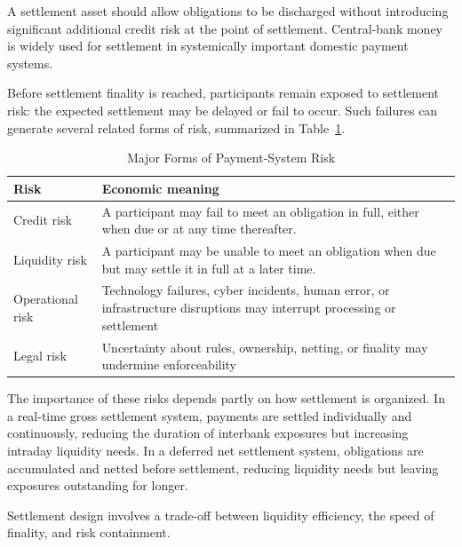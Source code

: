 A settlement asset should allow obligations to be discharged without introducing significant additional credit risk at the point of settlement. Central-bank money is widely used for settlement in systemically important domestic payment systems.

Before settlement finality is reached, participants remain exposed to settlement risk: the expected settlement may be delayed or fail to occur. Such failures can generate several related forms of risk, summarized in Table~\ref     {tab:ch2-payment-risk}.

\begin{table}[H]
\centering
\caption{Major Forms of Payment-System Risk}
\label{tab:ch2-payment-risk}

\renewcommand{\arraystretch}{1.2}

\begin{tabularx}{\textwidth}{
    @{}
    >{\raggedright\arraybackslash}p{3.0cm}
    >{\raggedright\arraybackslash}X
    @{}
}
\toprule
\textbf{Risk}
& \textbf{Economic meaning} \\
\midrule


Credit risk
& A participant may fail to meet an obligation in full, either when due or at any time thereafter. \\

Liquidity risk
& A participant may be unable to meet an obligation when due but may settle it in full at a later time. \\

Operational risk
& Technology failures, cyber incidents, human error, or infrastructure disruptions may interrupt processing or settlement \\

Legal risk
& Uncertainty about rules, ownership, netting, or finality may undermine enforceability \\

\bottomrule
\end{tabularx}
\end{table}

The importance of these risks depends partly on how settlement is organized. In a real-time gross settlement system, payments are settled individually and continuously, reducing the duration of interbank exposures but increasing intraday liquidity needs. In a deferred net settlement system, obligations are accumulated and netted before settlement, reducing liquidity needs but leaving exposures outstanding for longer.

Settlement design involves a trade-off between liquidity efficiency, the speed of finality, and risk containment.

